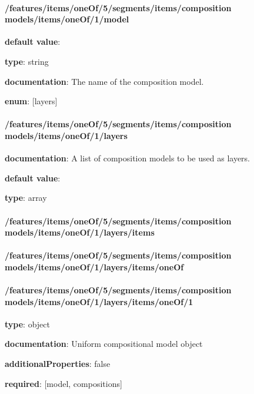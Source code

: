 \paragraph{/features/items/oneOf/5/segments/items/composition models/items/oneOf/1/model} \begin{itemized}
\item {\bf default value}: 
\item {\bf type}: string
\item {\bf documentation}: The name of the composition model.
\item {\bf enum}: [layers]\end{itemized}\paragraph{/features/items/oneOf/5/segments/items/composition models/items/oneOf/1/layers} \begin{itemized}
\item {\bf documentation}: A list of composition models to be used as layers.
\item {\bf default value}: 
\item {\bf type}: array
\paragraph{/features/items/oneOf/5/segments/items/composition models/items/oneOf/1/layers/items} \begin{itemized}
\end{itemized}\end{itemized}\paragraph{/features/items/oneOf/5/segments/items/composition models/items/oneOf/1/layers/items/oneOf} \begin{itemized}
\end{itemized}\paragraph{/features/items/oneOf/5/segments/items/composition models/items/oneOf/1/layers/items/oneOf/1} \begin{itemized}
\item {\bf type}: object
\item {\bf documentation}: Uniform compositional model object
\item {\bf additionalProperties}: false
\item {\bf required}: [model, compositions]\end{itemized}
